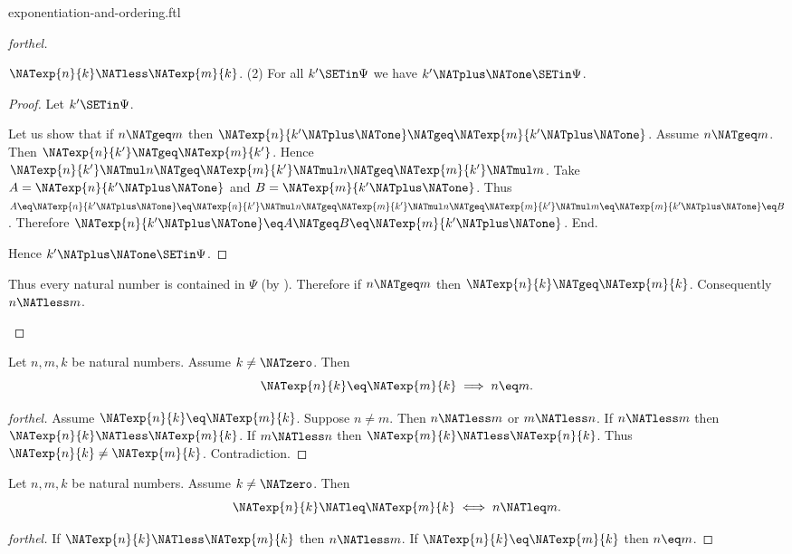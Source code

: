 \documentclass{naproche-library}
\begin{document}
\begin{smodule}[title=Exponentiation and Ordering]{exponentiation-and-ordering.ftl}
\begin{proof}[forthel]
\begin{case}{$\NATexp{n}{k} \NATless \NATexp{m}{k}$.}
    (2) For all $k' \SETin \Psi$ we have $k' \NATplus \NATone \SETin \Psi$.
    \begin{proof}
      Let $k' \SETin \Psi$.

      Let us show that if $n \NATgeq m$ then $\NATexp{n}{k' \NATplus \NATone} \NATgeq \NATexp{m}{k' \NATplus \NATone}$.
        Assume $n \NATgeq m$.
        Then $\NATexp{n}{k'} \NATgeq \NATexp{m}{k'}$.
        Hence $\NATexp{n}{k'} \NATmul n \NATgeq \NATexp{m}{k'} \NATmul n \NATgeq \NATexp{m}{k'} \NATmul m$.
        Take $A = \NATexp{n}{k' \NATplus \NATone}$ and $B = \NATexp{m}{k' \NATplus \NATone}$. %
        Thus $A
          \eq \NATexp{n}{k' \NATplus \NATone}
          \eq \NATexp{n}{k'} \NATmul n
          \NATgeq \NATexp{m}{k'} \NATmul n
          \NATgeq \NATexp{m}{k'} \NATmul m
          \eq \NATexp{m}{k' \NATplus \NATone}
          \eq B$.
        Therefore $\NATexp{n}{k' \NATplus \NATone} \eq A \NATgeq B \eq \NATexp{m}{k' \NATplus \NATone}$.
      End.

      Hence $k' \NATplus \NATone \SETin \Psi$.
    \end{proof}

    Thus every natural number is contained in $\Psi$ (by ).
    Therefore if $n \NATgeq m$ then $\NATexp{n}{k} \NATgeq \NATexp{m}{k}$.
    Consequently $n \NATless m$.
  \end{case}
\end{proof}

\begin{corollary}[forthel,id=ARITHMETIC_09_2797602550579200]
  Let $n, m, k$ be natural numbers.
  Assume $k \neq \NATzero$.
  Then \[ \NATexp{n}{k} \eq \NATexp{m}{k} \implies n \eq m. \]
\end{corollary}
\begin{proof}[forthel]
  Assume $\NATexp{n}{k} \eq \NATexp{m}{k}$.
  Suppose $n \neq m$.
  Then $n \NATless m$ or $m \NATless n$.
  If $n \NATless m$ then $\NATexp{n}{k} \NATless \NATexp{m}{k}$.
  If $m \NATless n$ then $\NATexp{m}{k} \NATless \NATexp{n}{k}$.
  Thus $\NATexp{n}{k} \neq \NATexp{m}{k}$.
  Contradiction.
\end{proof}

\begin{corollary}[forthel,id=ARITHMETIC_09_6875081963732992]
  Let $n, m, k$ be natural numbers.
  Assume $k \neq \NATzero$.
  Then \[ \NATexp{n}{k} \NATleq \NATexp{m}{k} \iff n \NATleq m. \]
\end{corollary}
\begin{proof}[forthel]
  If $\NATexp{n}{k} \NATless \NATexp{m}{k}$ then $n \NATless m$.
  If $\NATexp{n}{k} \eq \NATexp{m}{k}$ then $n \eq m$.


\end{proof}
\end{smodule}
\end{document}
